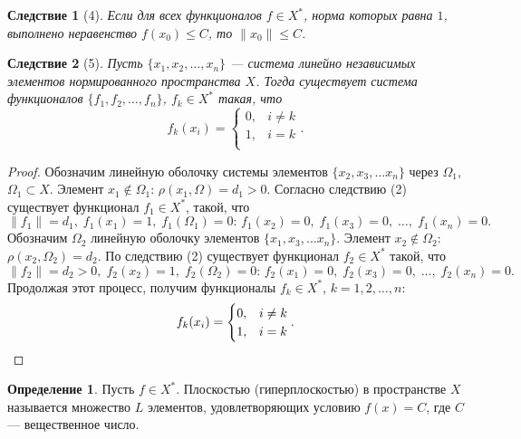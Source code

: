 \documentclass[12pt,a4paper,titlepage,oneside]{book}
\theoremstyle{definition}
\newtheorem*{definition}{Определение}
\theoremstyle{plain}
\theoremstyle{break}
\theoremstyle{remark}
\theoremstyle{remark}
\theoremstyle{remark}
\theoremstyle{remark}
\theoremstyle{plain}
\theoremstyle{plain}
\newtheorem*{corollary}{Следствие}
\begin{document}
\begin{corollary}[4]
Если для всех функционалов $f \in X^*$, норма которых равна $1$, выполнено неравенство $f(x_0)\leqslant C$, то $\lVert x_0 \rVert \leqslant C$.
\end{corollary}

\begin{corollary}[5]
Пусть $\{ x_1, x_2, \ldots, x_n\}$ --- система линейно независимых элементов нормированного пространства $X$. Тогда существует система функционалов $\{ f_1, f_2, \ldots, f_n\}$, $f_k \in X^*$ такая, что 
\begin{equation*}
f_k(x_i) = 
\begin{cases}
   0, &i\neq k\\
   1, &i=k\\
\end{cases}.
\end{equation*}
\end{corollary}
\begin{proof}
Обозначим линейную оболочку системы элементов $\{ x_2, x_3, \ldots x_n\}$ через $\Omega_1$, $\Omega_1 \subset X$. Элемент $x_1 \notin \Omega_1$: $\rho(x_1, \Omega)=d_1>0$. Согласно следствию (2) существует функционал $f_1 \in X^*$, такой, что 
\begin{equation*}
\lVert f_1 \rVert =d_1, \; f_1(x_1)=1, \; f_1(\Omega_1)=0 \mbox{: } f_1(x_2)=0, \; f_1(x_3)=0, \;\ldots, \; f_1(x_n)=0.
\end{equation*}
Обозначим $\Omega_2$ линейную оболочку элементов $\{ x_1, x_3, \ldots x_n\}$. Элемент $x_2 \notin \Omega_2$: $\rho(x_2, \Omega_2)=d_2$. По следствию (2) существует функционал $f_2 \in X^*$ такой, что 
\begin{equation*}
\lVert f_2 \rVert=d_2 > 0, \; f_2(x_2)=1, \; f_2(\Omega_2)=0 \mbox{: } f_2(x_1)=0, \; f_2(x_3)=0, \;\ldots, \; f_2(x_n)=0.
\end{equation*}
Продолжая этот процесс, получим функционалы $f_k \in X^*$, $k=1, 2, \ldots, n$:
\begin{equation*}
f_k(x_i) = 
\begin{cases}
   0, &i\neq k\\
   1, &i=k\\
\end{cases}.
\qedhere
\end{equation*}
\end{proof}

\begin{definition}
Пусть $f \in X^*$. Плоскостью (гиперплоскостью) в пространстве $X$ называется множество $L$ элементов, удовлетворяющих условию $f(x)=C$, где $C$ --- вещественное число.
\end{definition}
\end{document}
